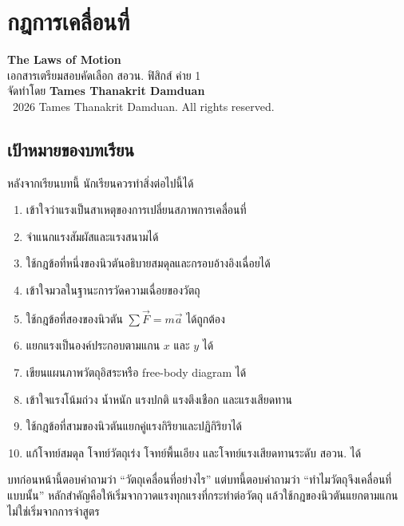 
\chapter{กฎการเคลื่อนที่}

\begin{center}
    {\Large \textbf{The Laws of Motion}}\\[4pt]
    {\normalsize เอกสารเตรียมสอบคัดเลือก สอวน. ฟิสิกส์ ค่าย 1}\\[6pt]
    {\normalsize จัดทำโดย \textbf{Tames Thanakrit Damduan}}\\[2pt]
    {\footnotesize \textcopyright\ 2026 Tames Thanakrit Damduan. All rights reserved.}\\[8pt]
\end{center}

\section*{เป้าหมายของบทเรียน}

หลังจากเรียนบทนี้ นักเรียนควรทำสิ่งต่อไปนี้ได้

\begin{enumerate}
    \item เข้าใจว่าแรงเป็นสาเหตุของการเปลี่ยนสภาพการเคลื่อนที่
    \item จำแนกแรงสัมผัสและแรงสนามได้
    \item ใช้กฎข้อที่หนึ่งของนิวตันอธิบายสมดุลและกรอบอ้างอิงเฉื่อยได้
    \item เข้าใจมวลในฐานะการวัดความเฉื่อยของวัตถุ
    \item ใช้กฎข้อที่สองของนิวตัน $\sum \vec{F}=m\vec{a}$ ได้ถูกต้อง
    \item แยกแรงเป็นองค์ประกอบตามแกน $x$ และ $y$ ได้
    \item เขียนแผนภาพวัตถุอิสระหรือ free-body diagram ได้
    \item เข้าใจแรงโน้มถ่วง น้ำหนัก แรงปกติ แรงตึงเชือก และแรงเสียดทาน
    \item ใช้กฎข้อที่สามของนิวตันแยกคู่แรงกิริยาและปฏิกิริยาได้
    \item แก้โจทย์สมดุล โจทย์วัตถุเร่ง โจทย์พื้นเอียง และโจทย์แรงเสียดทานระดับ สอวน. ได้
\end{enumerate}

\begin{tcolorbox}[title=แนวคิดสำคัญของบทนี้]
บทก่อนหน้านี้ตอบคำถามว่า ``วัตถุเคลื่อนที่อย่างไร'' แต่บทนี้ตอบคำถามว่า ``ทำไมวัตถุจึงเคลื่อนที่แบบนั้น'' หลักสำคัญคือให้เริ่มจากวาดแรงทุกแรงที่กระทำต่อวัตถุ แล้วใช้กฎของนิวตันแยกตามแกน ไม่ใช่เริ่มจากการจำสูตร
\end{tcolorbox}

